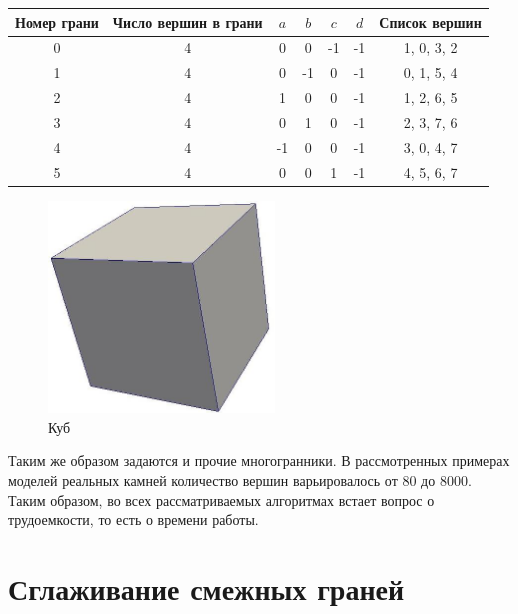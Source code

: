 \documentclass[a4paper,12pt, titlepage]{article}
\begin{document}
\begin{flushleft}
  \begin{tabular}{|c|c|c|c|c|c|c|}
    \hline
      Номер грани & Число вершин в грани & $a$ & $b$ & $c$ & $d$ & Список вершин \\
    \hline
      0 & 4 &       0 & 0 &-1 &-1&      1, 0, 3, 2 \\
      1 & 4 &       0 &-1 & 0 &-1&      0, 1, 5, 4 \\
      2 & 4 &       1 & 0 & 0 &-1&      1, 2, 6, 5 \\
      3 & 4 &       0 & 1 & 0 &-1&      2, 3, 7, 6 \\
      4 & 4 &      -1 & 0 & 0 &-1&      3, 0, 4, 7 \\
      5 & 4 &       0 & 0 & 1 &-1&      4, 5, 6, 7 \\
    \hline
  \end{tabular}
\end{flushleft}
\begin{flushleft}
  \begin{figure}[h]
    \includegraphics[clip, width=6cm]{img/cube.jpeg}
    \caption{Куб}\label{poly-cube}
  \end{figure}
\end{flushleft}
\begin{flushleft}
 Таким же образом задаются и прочие многогранники. В рассмотренных примерах моделей реальных камней количество
вершин варьировалось от 80 до 8000. Таким образом, во всех рассматриваемых алгоритмах встает вопрос о 
трудоемкости, то есть о времени работы.
\end{flushleft}

\section{Сглаживание смежных граней}
\end{document}
